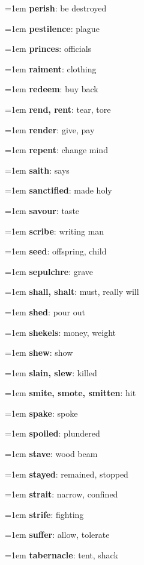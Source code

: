 {\begin{multicols}{3}
{\hangindent=1em \textbf{perish}: be destroyed\par
\hangindent=1em \textbf{pestilence}: plague\par
\hangindent=1em \textbf{princes}: officials\par
\hangindent=1em \textbf{raiment}: clothing\par
\hangindent=1em \textbf{redeem}: buy back\par
\hangindent=1em \textbf{rend, rent}: tear, tore\par
\hangindent=1em \textbf{render}: give, pay\par
\hangindent=1em \textbf{repent}: change mind\par
\hangindent=1em \textbf{saith}: says\par
\hangindent=1em \textbf{sanctified}: made holy\par
\hangindent=1em \textbf{savour}: taste\par
\hangindent=1em \textbf{scribe}: writing man\par
\hangindent=1em \textbf{seed}: offspring, child\par
\hangindent=1em \textbf{sepulchre}: grave\par
\hangindent=1em \textbf{shall, shalt}: must, really will\par
\hangindent=1em \textbf{shed}: pour out\par
\hangindent=1em \textbf{shekels}: money, weight\par
\hangindent=1em \textbf{shew}: show\par
\hangindent=1em \textbf{slain, slew}: killed\par
\hangindent=1em \textbf{smite, smote, smitten}: hit\par
\hangindent=1em \textbf{spake}: spoke\par
\hangindent=1em \textbf{spoiled}: plundered\par
\hangindent=1em \textbf{stave}: wood beam\par
\hangindent=1em \textbf{stayed}: remained, stopped\par
\hangindent=1em \textbf{strait}: narrow, confined\par
\hangindent=1em \textbf{strife}: fighting\par
\hangindent=1em \textbf{suffer}: allow, tolerate\par
\hangindent=1em \textbf{tabernacle}: tent, shack\par
}
\end{multicols}}
